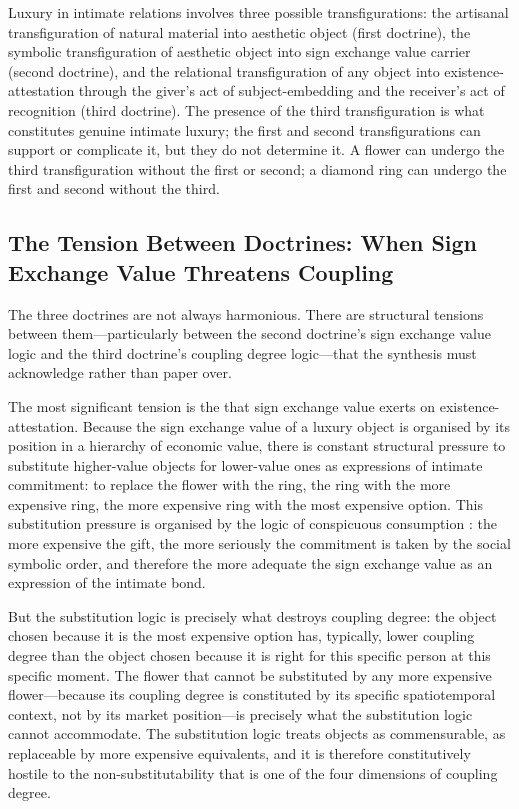 \begin{claim}
Luxury in intimate relations involves three possible transfigurations: the artisanal transfiguration of natural material into aesthetic object (first doctrine), the symbolic transfiguration of aesthetic object into sign exchange value carrier (second doctrine), and the relational transfiguration of any object into existence-attestation through the giver's act of subject-embedding and the receiver's act of recognition (third doctrine). The presence of the third transfiguration is what constitutes genuine intimate luxury; the first and second transfigurations can support or complicate it, but they do not determine it. A flower can undergo the third transfiguration without the first or second; a diamond ring can undergo the first and second without the third.
\end{claim}

\subsection{The Tension Between Doctrines: When Sign Exchange Value Threatens Coupling}
\label{p16:subsec:tension}

\noindent
The three doctrines are not always harmonious. There are structural tensions between them---particularly between the second doctrine's sign exchange value logic and the third doctrine's coupling degree logic---that the synthesis must acknowledge rather than paper over.

The most significant tension is the  that sign exchange value exerts on existence-attestation. Because the sign exchange value of a luxury object is organised by its position in a hierarchy of economic value, there is constant structural pressure to substitute higher-value objects for lower-value ones as expressions of intimate commitment: to replace the flower with the ring, the ring with the more expensive ring, the more expensive ring with the most expensive option. This substitution pressure is organised by the logic of conspicuous consumption \parencite{veblen1899}: the more expensive the gift, the more seriously the commitment is taken by the social symbolic order, and therefore the more adequate the sign exchange value as an expression of the intimate bond.

But the substitution logic is precisely what destroys coupling degree: the object chosen because it is the most expensive option has, typically, lower coupling degree than the object chosen because it is right for this specific person at this specific moment. The flower that cannot be substituted by any more expensive flower---because its coupling degree is constituted by its specific spatiotemporal context, not by its market position---is precisely what the substitution logic cannot accommodate. The substitution logic treats objects as commensurable, as replaceable by more expensive equivalents, and it is therefore constitutively hostile to the non-substitutability that is one of the four dimensions of coupling degree.

